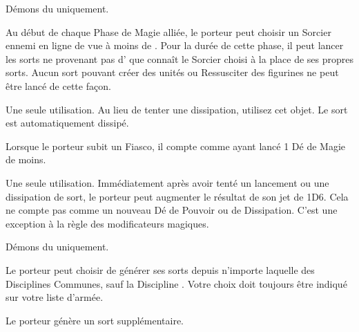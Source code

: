 \begin{multicols}{2}
\startpricelist

Démons du \textbf{\dchange} uniquement.

Au début de chaque Phase de Magie alliée, le porteur peut choisir un Sorcier ennemi en ligne de vue à moins de . Pour la durée de cette phase, il peut lancer les sorts ne provenant pas d'\boundspell{} que connaît le Sorcier choisi à la place de ses propres sorts. Aucun sort pouvant créer des unités ou Ressusciter des figurines ne peut être lancé de cette façon.

Une seule utilisation. Au lieu de tenter une dissipation, utilisez cet objet. Le sort est automatiquement dissipé.

Lorsque le porteur subit un Fiasco, il compte comme ayant lancé 1 Dé de Magie de moins.

Une seule utilisation. Immédiatement après avoir tenté un lancement ou une dissipation de sort, le porteur peut augmenter le résultat de son jet de 1D6. Cela ne compte pas comme un nouveau Dé de Pouvoir ou de Dissipation. C'est une exception à la règle des modificateurs magiques.

Démons du \textbf{\dchange} uniquement.

Le porteur peut choisir de générer ses sorts depuis n'importe laquelle des Disciplines Communes, sauf la Discipline \light{}. Votre choix doit toujours être indiqué sur votre liste d'armée.

Le porteur génère un sort supplémentaire.

\endpricelist

\end{multicols}
\closearmynewsection













\quickrefsheettitle

